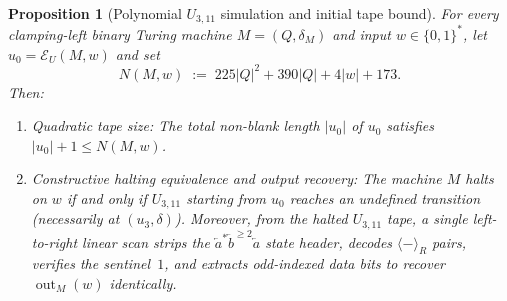 \documentclass[11pt,reqno]{amsart}
\numberwithin{equation}{section}
\theoremstyle{plain}
\newtheorem{proposition}[theorem]{Proposition}
\theoremstyle{definition}
\theoremstyle{remark}
\DeclareMathOperator{\out}{out}
\begin{document}
\begin{proposition}[Polynomial $U_{3,11}$ simulation and initial tape bound]\label{prop:u311-sim}
For every clamping-left binary Turing machine $M = (Q, \delta_M)$ and input $w \in \{0,1\}^*$, let $u_0 = \mathcal{E}_U(M, w)$ and set
\begin{equation}\label{eq:polyN-def}
  N(M, w) \;:=\; 225|Q|^2 + 390|Q| + 4|w| + 173.
\end{equation}
Then:
\begin{enumerate}[label=(\roman*),leftmargin=2.2em]
  \item \emph{Quadratic tape size:} The total non-blank length $|u_0|$ of $u_0$ satisfies $|u_0| + 1 \le N(M,w)$.
  \item \emph{Constructive halting equivalence and output recovery:} The machine $M$ halts on $w$ if and only if $U_{3,11}$ starting from $u_0$ reaches an undefined transition (necessarily at $(u_3, \delta)$). Moreover, from the halted $U_{3,11}$ tape, a single left-to-right linear scan strips the $\overleftarrow{a}^*\overleftarrow{b}^{\ge 2}\overleftarrow{a}$ state header, decodes $\langle - \rangle_R$ pairs, verifies the sentinel~$1$, and extracts odd-indexed data bits to recover $\out_M(w)$ identically.
\end{enumerate}
\end{proposition}
\end{document}
